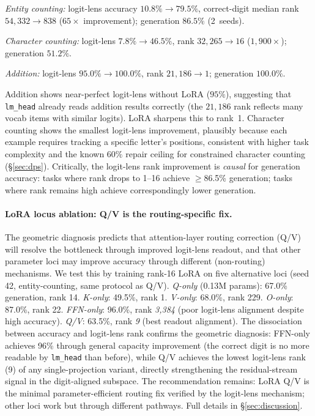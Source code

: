 \documentclass{article}
\begin{document}
\noindent\emph{Entity counting:} logit-lens accuracy $10.8\% \to 79.5\%$, correct-digit
median rank $54{,}332 \to 838$ ($65\times$ improvement);
generation $86.5\%$ (2~seeds).

\noindent\emph{Character counting:} logit-lens $7.8\% \to 46.5\%$, rank $32{,}265 \to 16$
($1{,}900\times$); generation $51.2\%$.

\noindent\emph{Addition:} logit-lens $95.0\% \to 100.0\%$, rank $21{,}186 \to 1$;
generation $100.0\%$.

Addition shows near-perfect logit-lens without LoRA ($95\%$), suggesting that
\texttt{lm\_head} already reads addition results correctly (the $21{,}186$ rank
reflects many vocab items with similar logits). LoRA sharpens this to rank~1.
Character counting shows the smallest logit-lens improvement, plausibly because each
example requires tracking a specific letter's positions, consistent with higher task
complexity and the known $60\%$ repair ceiling for constrained character counting
(\S\ref{sec:dps}).
Critically, the logit-lens rank improvement is \emph{causal} for generation accuracy:
tasks where rank drops to 1--16 achieve $\geq$86.5\% generation; tasks where rank remains
high achieve correspondingly lower generation.

\paragraph{LoRA locus ablation: Q/V is the routing-specific fix.}
The geometric diagnosis predicts that attention-layer routing correction (Q/V) will
resolve the bottleneck through improved logit-lens readout, and that other parameter
loci may improve accuracy through different (non-routing) mechanisms.
We test this by training rank-16 LoRA on five alternative loci (seed 42, entity-counting,
same protocol as Q/V).
\emph{Q-only} (0.13M params): 67.0\% generation, rank 14.
\emph{K-only}: 49.5\%, rank 1.
\emph{V-only}: 68.0\%, rank 229.
\emph{O-only}: 87.0\%, rank 22.
\emph{FFN-only}: 96.0\%, rank \emph{3,384} (poor logit-lens alignment despite high accuracy).
\emph{Q/V}: 63.5\%, rank \emph{9} (best readout alignment).
The dissociation between accuracy and logit-lens rank confirms the geometric diagnosis:
FFN-only achieves 96\% through general capacity improvement (the correct digit is no
more readable by \texttt{lm\_head} than before), while Q/V achieves the lowest
logit-lens rank (9) of any single-projection variant, directly strengthening the
residual-stream signal in the digit-aligned subspace.
The recommendation remains: LoRA Q/V is the minimal parameter-efficient routing fix
verified by the logit-lens mechanism; other loci work but through different pathways.
Full details in \S\ref{sec:discussion}.
\end{document}
